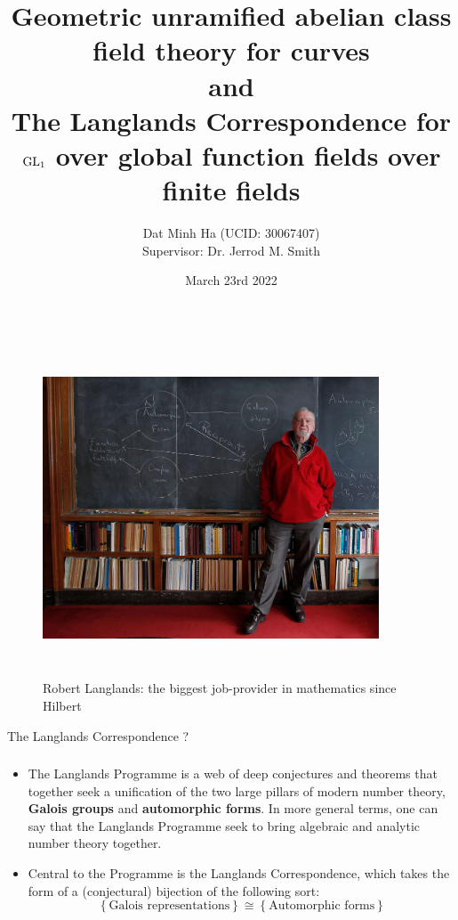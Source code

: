\documentclass[professionalfonts]{beamer}
\title{Geometric unramified abelian class field theory for curves\\and\\The Langlands Correspondence for $\operatorname{GL}_1$ over global function fields over finite fields}
\author{Dat Minh Ha (UCID: 30067407)\\Supervisor: Dr. Jerrod M. Smith}
\institute{Department of Mathematics and Statistics\\University of Calgary}
\date{March 23rd 2022}
\begin{document}
    \frame{\titlepage}
    
    \begin{frame}
        \begin{figure}[H]
            \centering
            \includegraphics[width=10cm,height=10cm,keepaspectratio]{Proposal, timeline, and presentation/robert_langlands.jpg}
            \caption{Robert Langlands: the biggest job-provider in mathematics since Hilbert}
            \label{fig: robert_langlands}
        \end{figure}
    \end{frame}
    
    \begin{frame}{The Langlands Correspondence ?}
        \frametitle{}
        \begin{itemize}
            \item The Langlands Programme is a web of deep conjectures and theorems that together seek a unification of the two large pillars of modern number theory, \textbf{Galois groups} and \textbf{automorphic forms}. In more general terms, one can say that the Langlands Programme seek to bring algebraic and analytic number theory together.
            \item Central to the Programme is the Langlands Correspondence, which takes the form of a (conjectural) bijection of the following sort:    
                $$\left\{\text{Galois representations}\right\} \cong \left\{\text{Automorphic forms}\right\}$$
        \end{itemize}
    \end{frame}
    
\end{document}
